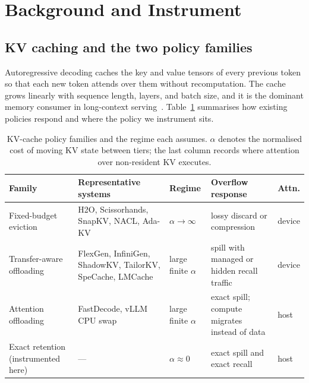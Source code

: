 \documentclass[manuscript,anonymous,review]{acmart}
\begin{document}
\section{Background and Instrument}
\label{sec:background}

\subsection{KV caching and the two policy families}

Autoregressive decoding caches the key and value tensors of every
previous token so that each new token attends over them without
recomputation. The cache grows linearly with sequence length, layers,
and batch size, and it is the dominant memory consumer in long-context
serving~\cite{kwon2023vllm}. Table~\ref{tab:families} summarises how
existing policies respond and where the policy we instrument sits.

\begin{table}[t]
  \centering
  \caption{KV-cache policy families and the regime each assumes.
  $\alpha$ denotes the normalised cost of moving KV state between
  tiers; the last column records where attention over non-resident KV
  executes.}
  \label{tab:families}
  \renewcommand{\arraystretch}{1.25}
  \begin{tabular}{@{}p{}p{}p{}p{}p{}@{}}
    \toprule
    \textbf{Family} & \textbf{Representative systems} & \textbf{Regime}
      & \textbf{Overflow response} & \textbf{Attn.} \\
    \midrule
    Fixed-budget eviction
      & H2O, Scissorhands, SnapKV, NACL, Ada-KV
      & $\alpha \rightarrow \infty$
      & lossy discard or compression
      & device \\
    Transfer-aware offloading
      & FlexGen, InfiniGen, ShadowKV, TailorKV, SpeCache, LMCache
      & large finite $\alpha$
      & spill with managed or hidden recall traffic
      & device \\
    Attention offloading
      & FastDecode, vLLM CPU swap
      & large finite $\alpha$
      & exact spill; compute migrates instead of data
      & host \\
    \midrule
    Exact retention (instrumented here)
      & ---
      & $\alpha \approx 0$
      & exact spill and exact recall
      & host \\
    \bottomrule
  \end{tabular}
\end{table}
\end{document}
